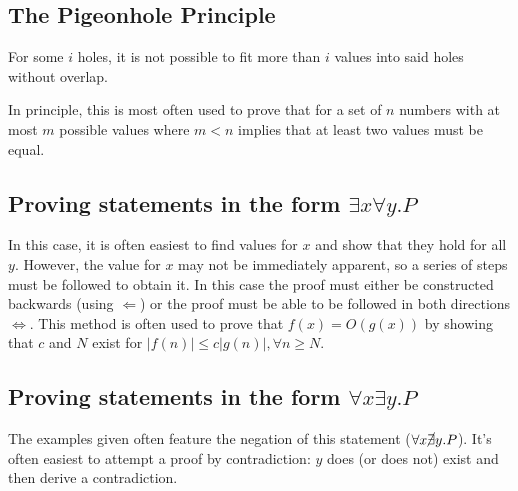 \documentclass[10pt]{article}
\begin{document}
\subsection{The Pigeonhole Principle}
For some $i$ holes, it is not possible to fit more than $i$ values into said holes without overlap.

In principle, this is most often used to prove that for a set of $n$ numbers with at most $m$ possible values where $m<n$ implies that at least two values must  be equal.
\subsection{Proving statements in the form $\exists x\forall y.P$}
In this case, it is often easiest to find values for $x$ and show that they hold for all $y$.  However, the value for $x$ may not be immediately apparent, so a series of steps must be followed to obtain it.  In this case the proof must either be constructed backwards (using $\Leftarrow$) or the proof must be able to be followed in both directions $\Leftrightarrow$.  This method is often used to prove that $f(x)=O(g(x))$ by showing that $c$ and $N$ exist for $\left|f(n)\right|\le c\left|g(n)\right|, \forall n\ge N$.
\subsection{Proving statements in the form $\forall x\exists y.P$}
The examples given often feature the negation of this statement ($\forall x \cancel\exists y.P$). It's often easiest to attempt a proof by contradiction:  $y$ does (or does not) exist and then derive a contradiction.
\end{document}
